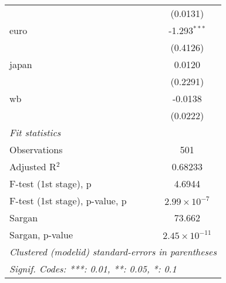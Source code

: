 \begin{tabular}{lc}
                                  & (0.0131)\\   
   euro                           & -1.293$^{***}$\\   
                                  & (0.4126)\\   
   japan                          & 0.0120\\   
                                  & (0.2291)\\   
   wb                             & -0.0138\\   
                                  & (0.0222)\\   
   \midrule
   \emph{Fit statistics}\\
   Observations                   & 501\\  
   Adjusted R$^2$                 & 0.68233\\  
   F-test (1st stage), p          & 4.6944\\  
   F-test (1st stage), p-value, p & $2.99\times 10^{-7}$\\   
   Sargan                         & 73.662\\  
   Sargan, p-value                & $2.45\times 10^{-11}$\\   
   \midrule \midrule
   \multicolumn{2}{l}{\emph{Clustered (modelid) standard-errors in parentheses}}\\
   \multicolumn{2}{l}{\emph{Signif. Codes: ***: 0.01, **: 0.05, *: 0.1}}\\
\end{tabular}
\par\endgroup



